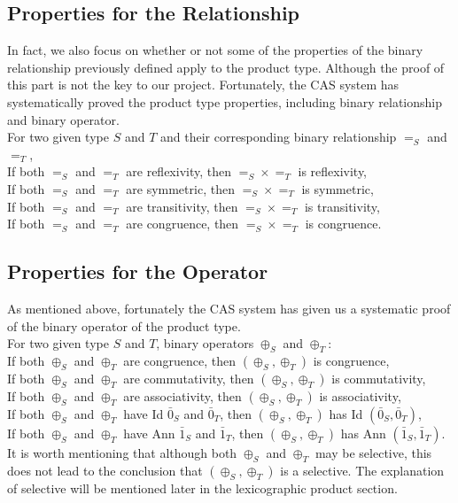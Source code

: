 \documentclass[a4paper,12pt,twoside,openright]{report}
\begin{document}
\subsection{Properties for the Relationship}
In fact, we also focus on whether or not some of the properties of the binary relationship previously defined apply to the product type. Although the proof of this part is not the key to our project. 
Fortunately, the CAS system has systematically proved the product type properties, including binary relationship and binary operator. \\
For two given type $S$ and $T$ and their corresponding binary relationship $=_S$ and $=_T$,\\
If both $=_S$ and $=_T$ are reflexivity, then $=_S \times =_T$ is reflexivity,\\
If both $=_S$ and $=_T$ are symmetric, then $=_S \times =_T$ is symmetric,\\
If both $=_S$ and $=_T$ are transitivity, then $=_S \times =_T$ is transitivity,\\
If both $=_S$ and $=_T$ are congruence, then $=_S \times =_T$ is congruence.
\subsection{Properties for the Operator}
As mentioned above, fortunately the CAS system has given us a systematic proof of the binary operator of the product type.\\
For two given type $S$ and $T$, binary operators $\oplus_S$ and $\oplus_T$:\\
If both $\oplus_S$ and $\oplus_T$ are congruence, then $(\oplus_S,\oplus_T)$ is congruence,\\
If both $\oplus_S$ and $\oplus_T$ are commutativity, then $(\oplus_S,\oplus_T)$ is commutativity,\\
If both $\oplus_S$ and $\oplus_T$ are associativity, then $(\oplus_S,\oplus_T)$ is associativity,\\
If both $\oplus_S$ and $\oplus_T$ have Id $\bar0_S$ and $\bar0_T$, then $(\oplus_S,\oplus_T)$ has Id $(\bar0_S,\bar0_T)$,\\
If both $\oplus_S$ and $\oplus_T$ have Ann $\bar1_S$ and $\bar1_T$, then $(\oplus_S,\oplus_T)$ has Ann $(\bar1_S,\bar1_T)$.\\
It is worth mentioning that although both $\oplus_S$ and $\oplus_T$ may be selective, this does not lead to the conclusion that $(\oplus_S,\oplus_T)$ is a selective.
The explanation of selective will be mentioned later in the lexicographic product section.
\end{document}
